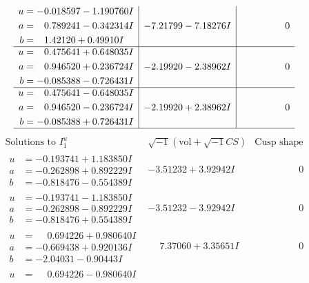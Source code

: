 \documentclass[1p]{elsarticle_modified}
\theoremstyle{definition}
\newcommand{\I}{\sqrt{-1}}
\begin{document}
$$\begin{array}{c|c|c}
\begin{aligned}
u &= -0.018597 - 1.190760 I \\
a &= \phantom{-}0.789241 - 0.342314 I \\
b &= \phantom{-}1.42120 + 0.49910 I\end{aligned}
 & -7.21799 - 7.18276 I & \phantom{-0.000000 } 0 \\ \hline\begin{aligned}
u &= \phantom{-}0.475641 + 0.648035 I \\
a &= \phantom{-}0.946520 + 0.236724 I \\
b &= -0.085388 - 0.726431 I\end{aligned}
 & -2.19920 - 2.38962 I & \phantom{-0.000000 } 0 \\ \hline\begin{aligned}
u &= \phantom{-}0.475641 - 0.648035 I \\
a &= \phantom{-}0.946520 - 0.236724 I \\
b &= -0.085388 + 0.726431 I\end{aligned}
 & -2.19920 + 2.38962 I & \phantom{-0.000000 } 0\\
 \hline 
 \end{array}$$\newpage$$\begin{array}{c|c|c}  
\text{Solutions to }I^u_{1}& \I (\text{vol} + \sqrt{-1}CS) & \text{Cusp shape}\\
 \hline 
\begin{aligned}
u &= -0.193741 + 1.183850 I \\
a &= -0.262898 + 0.892229 I \\
b &= -0.818476 - 0.554389 I\end{aligned}
 & -3.51232 + 3.92942 I & \phantom{-0.000000 } 0 \\ \hline\begin{aligned}
u &= -0.193741 - 1.183850 I \\
a &= -0.262898 - 0.892229 I \\
b &= -0.818476 + 0.554389 I\end{aligned}
 & -3.51232 - 3.92942 I & \phantom{-0.000000 } 0 \\ \hline\begin{aligned}
u &= \phantom{-}0.694226 + 0.980640 I \\
a &= -0.669438 + 0.920136 I \\
b &= -2.04031 - 0.90443 I\end{aligned}
 & \phantom{-}7.37060 + 3.35651 I & \phantom{-0.000000 } 0 \\ \hline\begin{aligned}
u &= \phantom{-}0.694226 - 0.980640 I \\

\end{aligned}
\end{array}$$
\end{document}
